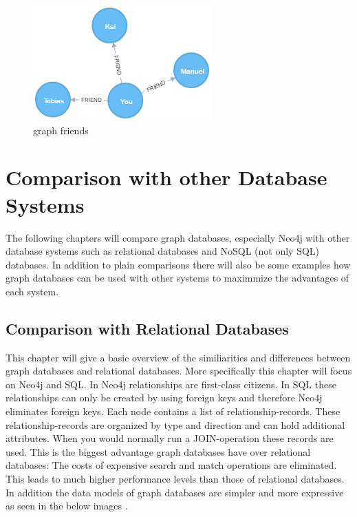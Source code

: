 \begin{figure}[H]
	\includegraphics[width=\linewidth,keepaspectratio]{images/neo4j/friends.png}
	\caption{graph friends}
\end{figure}

\section{Comparison with other Database Systems}

The following chapters will compare graph databases, especially Neo4j with other database systems such as relational databases and NoSQL (not only SQL) databases. In addition to plain comparisons there will also be some examples how graph databases can be used with other systems to maximmize the advantages of each system.

\subsection{Comparison with Relational Databases}

This chapter will give a basic overview of the similiarities and differences between graph databases and relational databases. More specifically this chapter will focus on Neo4j and SQL. 
In Neo4j relationships are first-class citizens. In SQL these relationships can only be created by using foreign keys and therefore Neo4j eliminates foreign keys. Each node contains a list of relationship-records. These relationship-records are organized by type and direction and can hold additional attributes. When you would normally run a JOIN-operation these records are used. This is the biggest advantage graph databases have over relational databases: The costs of expensive search and match operations are eliminated.
This leads to much higher performance levels than those of relational databases.
In addition the data models of graph databases are simpler and more expressive as seen in the below images \cite[pp. 9-10]{HungerBoydLyon.2016}.

